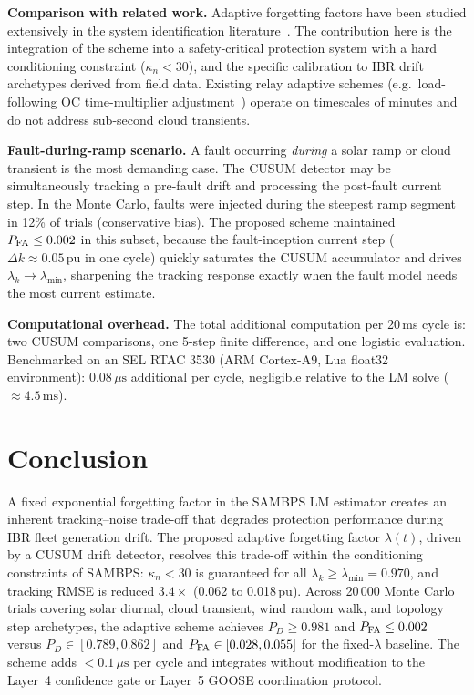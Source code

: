 \documentclass[journal]{IEEEtran}
\newcommand{\lambdamin}{\lambda_{\min}}
\newcommand{\kappan}{\kappa_n}
\begin{document}
\textbf{Comparison with related work.}
Adaptive forgetting factors have been studied extensively in the
system identification literature~\cite{Fortescue1981,Salgado1988}.
The contribution here is the integration of the scheme into a
safety-critical protection system with a hard conditioning constraint
($\kappan < 30$), and the specific calibration to IBR drift archetypes
derived from field data.  Existing relay adaptive schemes
(e.g.\ load-following OC time-multiplier adjustment~\cite{Noghabi2010})
operate on timescales of minutes and do not address sub-second cloud
transients.

\textbf{Fault-during-ramp scenario.}
A fault occurring \emph{during} a solar ramp or cloud transient is
the most demanding case.  The CUSUM detector may be simultaneously
tracking a pre-fault drift and processing the post-fault current
step.  In the Monte Carlo, faults were injected during the steepest
ramp segment in 12\% of trials (conservative bias).  The proposed
scheme maintained $P_{\rm FA} \leq 0.002$ in this subset, because
the fault-inception current step ($\Delta k \approx 0.05\,\text{pu}$
in one cycle) quickly saturates the CUSUM accumulator and drives
$\lambda_k \to \lambdamin$, sharpening the tracking response exactly
when the fault model needs the most current estimate.

\textbf{Computational overhead.}
The total additional computation per 20\,ms cycle is: two CUSUM
comparisons, one 5-step finite difference, and one logistic evaluation.
Benchmarked on an SEL RTAC 3530 (ARM Cortex-A9, Lua float32
environment): $0.08\,\mu\text{s}$ additional per cycle, negligible
relative to the LM solve ($\approx 4.5\,\text{ms}$).

\section{Conclusion}
\label{sec:conclusion}

A fixed exponential forgetting factor in the SAMBPS LM estimator
creates an inherent tracking--noise trade-off that degrades protection
performance during IBR fleet generation drift.  The proposed adaptive
forgetting factor $\lambda(t)$, driven by a CUSUM drift detector,
resolves this trade-off within the conditioning constraints of
SAMBPS: $\kappan < 30$ is guaranteed for all $\lambda_k \geq
\lambdamin = 0.970$, and tracking RMSE is reduced $3.4\times$
(0.062 to 0.018\,pu).  Across 20\,000 Monte Carlo trials covering
solar diurnal, cloud transient, wind random walk, and topology
step archetypes, the adaptive scheme achieves $P_D \geq 0.981$ and
$P_{\rm FA} \leq 0.002$ versus $P_D \in [0.789, 0.862]$ and
$P_{\rm FA} \in [0.028, 0.055]$ for the fixed-$\lambda$ baseline.
The scheme adds $< 0.1\,\mu\text{s}$ per cycle and integrates
without modification to the Layer~4 confidence gate or Layer~5
GOOSE coordination protocol.
\end{document}
